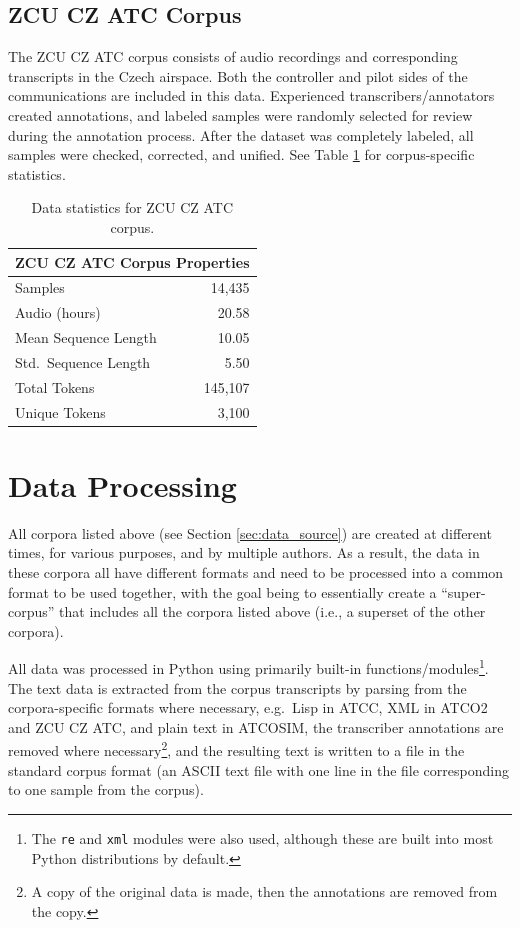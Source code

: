 \documentclass[12pt]{article}
\begin{document}
\subsection{ZCU CZ ATC Corpus}\label{sec:zcu_atc}
The ZCU CZ ATC corpus consists of audio recordings and corresponding transcripts in the Czech airspace. Both the controller and pilot sides of the communications are included in this data. Experienced transcribers/annotators created annotations, and labeled samples were randomly selected for review during the annotation process. After the dataset was completely labeled, all samples were checked, corrected, and unified\cite{smidl_air_2019}. See Table \ref{tab:zcu_cz_atc_stats} for corpus-specific statistics.

\begin{table}
    \centering
    \begin{tabular}{l r}
        \toprule
        \multicolumn{2}{c}{ZCU CZ ATC Corpus Properties} \\
        \midrule
        Samples              & 14,435                    \\
        Audio (hours)        & 20.58                     \\
        Mean Sequence Length & 10.05                     \\
        Std.~Sequence Length & 5.50                      \\
        Total Tokens         & 145,107                   \\
        Unique Tokens        & 3,100                     \\
        \bottomrule
    \end{tabular}
    \caption{Data statistics for ZCU CZ ATC corpus.}
    \label{tab:zcu_cz_atc_stats}
\end{table}

\section{Data Processing}\label{sec:data_processing}
All corpora listed above (see Section \ref{sec:data_source}) are created at different times, for various purposes, and by multiple authors. As a result, the data in these corpora all have different formats and need to be processed into a common format to be used together, with the goal being to essentially create a ``super-corpus'' that includes all the corpora listed above (i.e., a superset of the other corpora).

All data was processed in Python using primarily built-in functions/modules\footnote{The \lstinline|re| and \lstinline|xml| modules were also used, although these are built into most Python distributions by default.}. The text data is extracted from the corpus transcripts by parsing from the corpora-specific formats where necessary, e.g.~Lisp in ATCC, XML in ATCO2 and ZCU CZ ATC, and plain text in ATCOSIM, the transcriber annotations are removed where necessary\footnote{A copy of the original data is made, then the annotations are removed from the copy.}, and the resulting text is written to a file in the standard corpus format (an ASCII text file with one line in the file corresponding to one sample from the corpus).
\end{document}

